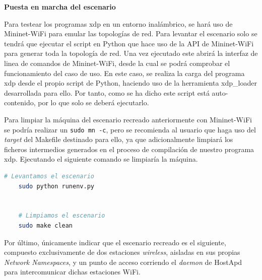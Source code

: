 \vspace{1cm}
\textbf{Puesta en marcha del escenario}\\
\par

Para testear los programas \gls{xdp} en un entorno inalámbrico, se hará uso de Mininet-WiFi para emular las topologías de red. Para levantar el escenario solo se tendrá que ejecutar el script en Python que hace uso de la API de Mininet-WiFi para generar toda la topología de red. Una vez ejecutado este abrirá la interfaz de linea de comandos de Mininet-WiFi, desde la cual se podrá comprobar el funcionamiento del caso de uso. En este caso, se realiza la carga del programa \gls{xdp} desde el propio script de Python, haciendo uso de la herramienta xdp\_loader desarrollada para ello. Por tanto, como se ha dicho este script está auto-contenido, por lo que solo se deberá ejecutarlo. \\
\par

Para limpiar la máquina del escenario recreado anteriormente con Mininet-WiFi se podría realizar un \texttt{sudo mn -c}, pero se recomienda al usuario que haga uso del \textit{target} del Makefile destinado para ello, ya que adicionalmente limpiará los ficheros intermedios generados en el proceso de compilación de nuestro programa \gls{xdp}. Ejecutando el siguiente comando se limpiaría la máquina.\\
\par

\begin{lstlisting}[language= bash, style=Consola, caption={Compilación programa XDP - Case02},label=code:case02_xdp_wifi_run]
    # Levantamos el escenario
    sudo python runenv.py
    
    
    # Limpiamos el escenario
    sudo make clean
\end{lstlisting}
\vspace{0.5cm}


Por último, únicamente indicar que el escenario recreado es el siguiente, compuesto exclusivamente de dos estaciones \textit{wireless}, aisladas en sus propias \textit{Network Namespaces}, y un punto de acceso corriendo el \textit{daemon} de HostApd para intercomunicar dichas estaciones WiFi.\\
\par

